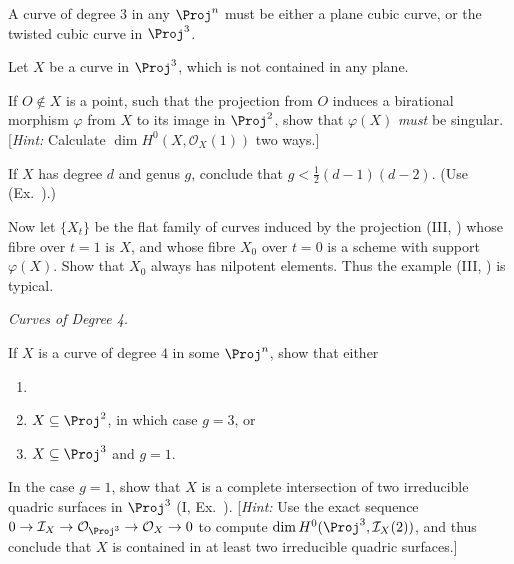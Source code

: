 {{\begin{description}[style=multiline,labelwidth=1.9em,leftmargin=2.2em,itemsep=4pt,topsep=0pt,parsep=0pt]
\begin{parts}
\item A curve of degree $3$ in any $\Proj^n$ must be either a plane cubic curve, or the twisted cubic curve in $\Proj^3$.
\end{parts}
\item[\hypertarget{ex-IV-3.5}{}3.5.] Let $X$ be a curve in $\Proj^3$, which is not contained in any plane.
\begin{parts}
\item If $O\notin X$ is a point, such that the projection from $O$ induces a birational morphism $\varphi$ from $X$ to its image in $\Proj^2$, show that $\varphi(X)$ \emph{must} be singular. [\emph{Hint:} Calculate $\dim H^0(X,\mathcal O_X(1))$ two ways.]
\item If $X$ has degree $d$ and genus $g$, conclude that $g<\frac12(d-1)(d-2)$. (Use (Ex.~).)
\item Now let $\{X_t\}$ be the flat family of curves induced by the projection (III, ) whose fibre over $t=1$ is $X$, and whose fibre $X_0$ over $t=0$ is a scheme with support $\varphi(X)$. Show that $X_0$ always has nilpotent elements. Thus the example (III, ) is typical.
\end{parts}
\item[\hypertarget{ex-IV-3.6}{}3.6.] \emph{Curves of Degree 4.}
\begin{parts}
\item If $X$ is a curve of degree $4$ in some $\Proj^n$, show that either
\begin{enumerate}[label=(\arabic*),leftmargin=1.65em,itemsep=0pt,topsep=2pt,parsep=0pt]
\item {}
\item $X\subseteq\Proj^2$, in which case $g=3$, or
\item $X\subseteq\Proj^3$ and $g=1$.
\end{enumerate}
\item In the case $g=1$, show that $X$ is a complete intersection of two irreducible quadric surfaces in $\Proj^3$ (I, Ex.~). [\emph{Hint:} Use the exact sequence $0\to\mathcal I_X\to\mathcal O_{\Proj^3}\to\mathcal O_X\to0$ to compute $\dim H^0(\Proj^3,\mathcal I_X(2))$, and thus conclude that $X$ is contained in at least two irreducible quadric surfaces.]
\end{parts}
\end{description}
}
}
